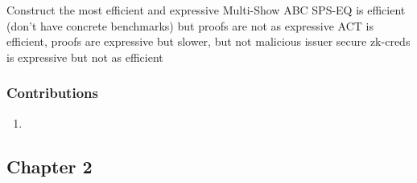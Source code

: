 Construct the most efficient and expressive Multi-Show ABC
SPS-EQ is efficient (don't have concrete benchmarks) but proofs are not as expressive
ACT is efficient, proofs are expressive but slower, but not malicious issuer secure
zk-creds is expressive but not as efficient


\subsubsection{Contributions}
\begin{enumerate}
    \item 
\end{enumerate}









\subsection{Chapter 2}

























